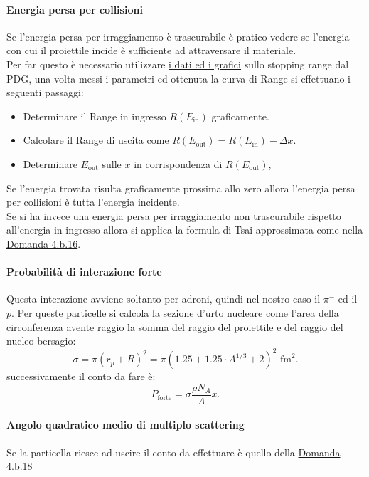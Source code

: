 \paragraph{Energia persa per collisioni}%
Se l'energia persa per irraggiamento è trascurabile è pratico vedere se l'energia con cui il proiettile incide è sufficiente ad attraversare il materiale.\\
Per far questo è necessario utilizzare \href{https://www.nist.gov/pml/stopping-power-range-tables-electrons-protons-and-helium-ions}{i dati ed i grafici} sullo stopping range dal PDG, una volta messi i parametri ed ottenuta la curva di Range si effettuano i seguenti passaggi:
\begin{itemize}
	\item Determinare il Range in ingresso $R\left( E_{\text{in}}\right)$ graficamente.
	\item Calcolare il Range di uscita come $R\left( E_{\text{out}} \right)= R\left( E_{\text{in}} \right) - \Delta x$.
	\item Determinare $E_{\text{out}}$ sulle $x$ in corrispondenza di $R\left( E_{\text{out}} \right)$,
\end{itemize}
Se l'energia trovata risulta graficamente prossima allo zero allora l'energia persa per collisioni è tutta l'energia incidente.\\
Se si ha invece una energia persa per irraggiamento non trascurabile rispetto all'energia in ingresso allora si applica la formula di Tsai approssimata come nella \hyperref[sec:4.b.16]{Domanda 4.b.16}.
\paragraph{Probabilità di interazione forte}%
Questa interazione avviene soltanto per adroni, quindi nel nostro caso il $\pi^{-}$ ed il $p$. Per queste particelle si calcola la sezione d'urto nucleare come l'area della circonferenza avente raggio la somma del raggio del proiettile e del raggio del nucleo bersagio:
\[
	\sigma=\pi\left( r_{p}+R \right)^2 = \pi\left( 1.25 + 1.25\cdot A^{1/3} + 2 \right)^2 \text{ fm}^2 
.\] 
successivamente il conto da fare è:
\[
	P_{\text{forte}}= \sigma \frac{\rho N_{A}}{A}x
.\] 
\paragraph{Angolo quadratico medio di multiplo scattering}%
Se la particella riesce ad uscire il conto da effettuare è quello della \hyperref[sec:4.b.18]{Domanda 4.b.18}

